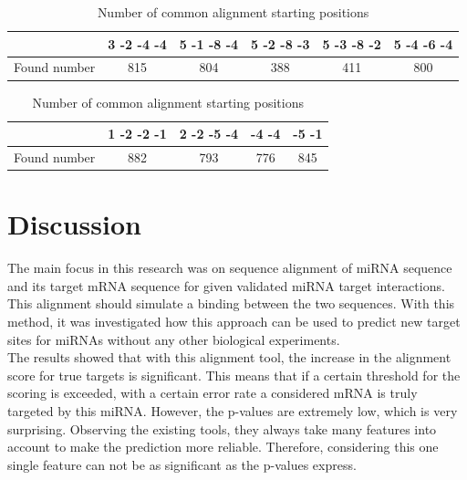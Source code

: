 \documentclass[11pt, a4paper, oneside]{book}
\begin{document}
\begin{table} [h]
\vspace{0.3cm}
\caption{Number of common alignment starting positions}

\begin{tabular}{c||c|c|c|c|c} 
& 3 -2 -4 -4 & 5 -1 -8 -4 & 5 -2 -8 -3 & 5 -3 -8 -2 & 5 -4 -6 -4  \\
\hline\hline
Found number & 815 & 804 & 388 & 411 & 800\\
\hline
\end{tabular}
\vspace{0.5cm}

\begin{tabular}{c||c|c|c|c}
& 1 -2 -2 -1 & 2 -2 -5 -4 & -4 -4 & -5 -1 \\
\hline\hline
Found number & 882 & 793 & 776 & 845  \\
\hline
\end{tabular}
\label{tab:positions}
\end{table}






\chapter{Discussion}
\label{chapter:discussion}

The main focus in this research was on sequence alignment of miRNA sequence and its target mRNA sequence for given validated miRNA target interactions. This alignment should simulate a binding between the two sequences. With this method, it was investigated how this approach can be used to predict new target sites for miRNAs without any other biological experiments.\\

The results showed that with this alignment tool, the increase in the alignment score for true targets is significant. This means that if a certain threshold for the scoring is exceeded, with a certain error rate a considered mRNA is truly targeted by this miRNA. However, the p-values are extremely low, which is very surprising. Observing the existing tools, they always take many features into account to make the prediction more reliable. Therefore, considering this one single feature can not be as significant as the p-values express.\\
\end{document}
